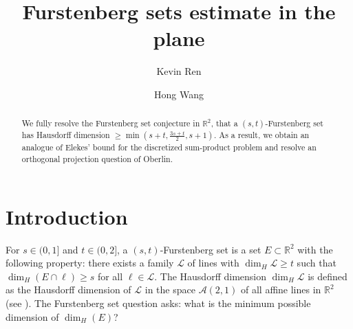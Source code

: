 \documentclass{amsart}
\title{Furstenberg sets estimate in the plane}
\author{Kevin Ren}
\author{Hong Wang}
\begin{document}
\maketitle

\begin{abstract}
    We fully resolve the Furstenberg set conjecture in $\mathbb{R}^2$, that a $(s, t)$-Furstenberg set has Hausdorff dimension $\ge \min(s+t, \frac{3s+t}{2}, s+1)$. As a result, we obtain an analogue of Elekes' bound for the discretized sum-product problem and resolve an orthogonal projection question of Oberlin.
\end{abstract}











\section{Introduction}
For $s \in (0, 1]$ and $t \in (0, 2]$, a $(s,t)$-Furstenberg set is a set $E\subset\mathbb{R}^2$ with the following property: there exists a family $\mathcal{L}$ of lines with $\dim_H \mathcal{L}\geq t$ such that $\dim_H(E\cap \ell)\geq s$ for all $\ell \in \mathcal{L}$. The Hausdorff dimension $\dim_H\mathcal{L}$ is defined as the Hausdorff dimension of $\mathcal{L}$ in the space $\mathcal{A}(2,1)$ of all affine lines in $\mathbb{R}^2$ (see \cite[Section 3.16]{mattila1999geometry}). The Furstenberg set question asks: what is the minimum possible dimension of $\dim_H (E)$?
\end{document}
